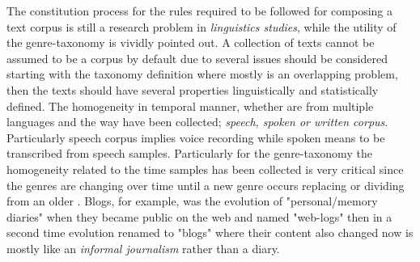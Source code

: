 The constitution process for the rules required to be followed for composing a text corpus is still a research problem in \textit{linguistics studies}, while the utility of the genre-taxonomy is vividly pointed out. A collection of texts cannot be assumed to be a corpus by default due to several issues should be considered starting with the taxonomy definition where mostly is an overlapping problem, then the texts should have several properties linguistically and statistically defined. The homogeneity in temporal manner, whether are from multiple languages and the way have been collected; \textit{speech, spoken or written corpus}. Particularly speech corpus implies voice recording while spoken means to be transcribed from speech samples. Particularly for the genre-taxonomy the homogeneity related to the time samples has been collected is very critical since the genres are changing over time until a new genre occurs replacing or dividing from an older \parencite{dash2018history}. Blogs, for example, was the evolution of "personal/memory diaries" when they became public on the web and named "web-logs" then in a second time evolution renamed to "blogs" where their content also changed now is mostly like an \textit{informal journalism} rather than a diary.


